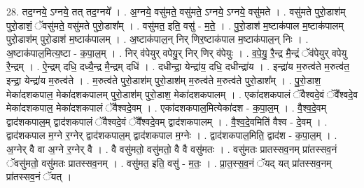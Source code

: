 \documentclass[17pt]{extarticle}
\begin{document}
28. तद॒ग्नये॒ ऽग्नये॒ तत् तद॒ग्नये᳚ । . अ॒ग्नये॒ वसु॑मते॒ वसु॑मते॒ ऽग्नये॒ ऽग्नये॒ वसु॑मते । . वसु॑मते पुरो॒डाश॑म् पुरो॒डाशं॒ ॅवसु॑मते॒ वसु॑मते पुरो॒डाश᳚म् । . वसु॑मत॒ इति॒ वसु॑ - म॒ते॒ । . पु॒रो॒डाश॑ म॒ष्टाक॑पाल म॒ष्टाक॑पालम् पुरो॒डाश॑म् पुरो॒डाश॑ म॒ष्टाक॑पालम् । . अ॒ष्टाक॑पाल॒न् निर् णिर॒ष्टाक॑पाल म॒ष्टाक॑पाल॒न् निः । . अ॒ष्टाक॑पाल॒मित्य॒ष्टा - क॒पा॒ल॒म् । . निर् व॑पेयुर् वपेयु॒र् निर् णिर् व॑पेयुः । . व॒पे॒यु॒ रै॒न्द्र मै॒न्द्रं ॅव॑पेयुर् वपेयु रै॒न्द्रम् । . ऐ॒न्द्रम् दधि॒ दध्यै॒न्द्र मै॒न्द्रम् दधि॑ । . दधीन्द्रा॒ येन्द्रा॑य॒ दधि॒ दधीन्द्रा॑य । . इन्द्रा॑य म॒रुत्व॑ते म॒रुत्व॑त॒ इन्द्रा॒ येन्द्रा॑य म॒रुत्व॑ते । . म॒रुत्व॑ते पुरो॒डाश॑म् पुरो॒डाश॑म् म॒रुत्व॑ते म॒रुत्व॑ते पुरो॒डाश᳚म् । . पु॒रो॒डाश॒ मेका॑दशकपाल॒ मेका॑दशकपालम् पुरो॒डाश॑म् पुरो॒डाश॒ मेका॑दशकपालम् । . एका॑दशकपालं ॅवैश्वदे॒वं ॅवै᳚श्वदे॒व मेका॑दशकपाल॒ मेका॑दशकपालं ॅवैश्वदे॒वम् । . एका॑दशकपाल॒मित्येका॑दश - क॒पा॒ल॒म् । . वै॒श्व॒दे॒वम् द्वाद॑शकपाल॒म् द्वाद॑शकपालं ॅवैश्वदे॒वं ॅवै᳚श्वदे॒वम् द्वाद॑शकपालम् । . वै॒श्व॒दे॒वमिति॑ वैश्व - दे॒वम् । . द्वाद॑शकपाल म॒ग्ने र॒ग्नेर् द्वाद॑शकपाल॒म् द्वाद॑शकपाल म॒ग्नेः । . द्वाद॑शकपाल॒मिति॒ द्वाद॑श - क॒पा॒ल॒म् । . अ॒ग्नेर् वै वा अ॒ग्ने र॒ग्नेर् वै । . वै वसु॑मतो॒ वसु॑मतो॒ वै वै वसु॑मतः । . वसु॑मतः प्रातस्सव॒नम् प्रा॑तस्सव॒नं ॅवसु॑मतो॒ वसु॑मतः प्रातस्सव॒नम् । . वसु॑मत॒ इति॒ वसु॑ - म॒तः॒ । . प्रा॒त॒स्स॒व॒नं ॅयद् यत् प्रा॑तस्सव॒नम् प्रा॑तस्सव॒नं ॅयत् । \newline
\end{document}
